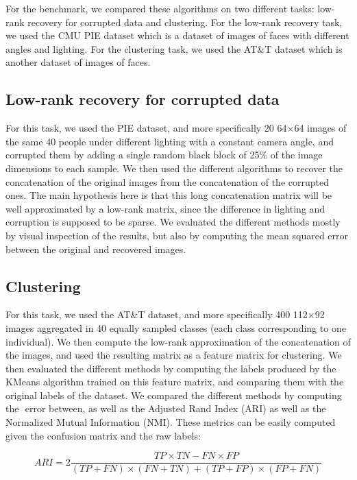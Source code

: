 \documentclass[sigconf]{acmart}
\begin{document}
For the benchmark, we compared these algorithms on two different tasks: low-rank recovery for corrupted data and clustering. For the low-rank recovery task, we used the CMU PIE dataset which is a dataset of images of faces with different angles and lighting. For the clustering task, we used the AT\&T dataset which is another dataset of images of faces.

\subsection{Low-rank recovery for corrupted data}

For this task, we used the PIE dataset, and more specifically 20 64$\times$64 images of the same 40 people under different lighting with a constant camera angle, and corrupted them by adding a single random black block of 25\% of the image dimensions to each sample. We then used the different algorithms to recover the concatenation of the original images from the concatenation of the corrupted ones. The main hypothesis here is that this long concatenation matrix will be well approximated by a low-rank matrix, since the difference in lighting and corruption is supposed to be sparse. We evaluated the different methods mostly by visual inspection of the results, but also by computing the mean squared error between the original and recovered images.

\subsection{Clustering}

For this task, we used the AT\&T dataset, and more specifically 400 112$\times$92 images aggregated in 40 equally sampled classes (each class corresponding to one individual). We then compute the low-rank approximation of the concatenation of the images, and used the resulting matrix as a feature matrix for clustering. We then evaluated the different methods by computing the labels produced by the KMeans algorithm trained on this feature matrix, and comparing them with the original labels of the dataset. We compared the different methods by computing the $ $ error between, as well as the Adjusted Rand Index (ARI) as well as the Normalized Mutual Information (NMI). These metrics can be easily computed given the confusion matrix and the raw labels:

\[ ARI = 2 \frac{TP \times TN - FN \times FP}{(TP + FN)\times(FN + TN) + (TP + FP)\times(FP + FN)} \]
\end{document}
